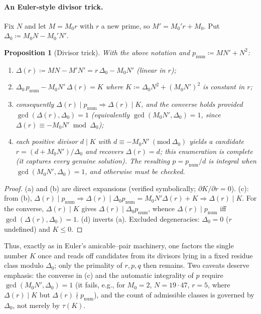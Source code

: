 \documentclass[11pt]{article}
\newtheorem{proposition}[theorem]{Proposition}
\theoremstyle{definition}
\begin{document}
\paragraph{An Euler-style divisor trick.}
Fix $N$ and let $M=M_0r$ with $r$ a new prime, so $M'=M_0'r+M_0$. Put
$\Delta_0\coloneqq M_0N-M_0'N'$.

\begin{proposition}[Divisor trick]\label{prop:divisor}
With the above notation and $p_{\mathrm{num}}\coloneqq MN'+N^2$:
\begin{enumerate}[label=\textup{(\alph*)},leftmargin=2.2em]
\item $\Delta(r)\coloneqq MN-M'N'=r\,\Delta_0-M_0N'$ \emph{(linear in $r$)};
\item $\Delta_0\,p_{\mathrm{num}}-M_0N'\,\Delta(r)=K$ where $K\coloneqq \Delta_0N^2+(M_0N')^2$ is
\emph{constant in $r$};
\item consequently $\Delta(r)\mid p_{\mathrm{num}}\Rightarrow \Delta(r)\mid K$, and the converse
holds provided $\gcd(\Delta(r),\Delta_0)=1$ \textup{(}equivalently $\gcd(M_0N',\Delta_0)=1$, since
$\Delta(r)\equiv-M_0N'\bmod\Delta_0$\textup{)};
\item each positive divisor $d\mid K$ with $d\equiv-M_0N'\ (\mathrm{mod}\ \Delta_0)$ yields a
candidate $r=(d+M_0N')/\Delta_0$ and recovers $\Delta(r)=d$; this enumeration is complete (it
captures every genuine solution). The resulting $p=p_{\mathrm{num}}/d$ is integral when
$\gcd(M_0N',\Delta_0)=1$, and otherwise must be checked.
\end{enumerate}
\end{proposition}

\begin{proof}
(a) and (b) are direct expansions (verified symbolically; $\partial K/\partial r=0$). (c): from
(b), $\Delta(r)\mid p_{\mathrm{num}}\Rightarrow\Delta(r)\mid\Delta_0p_{\mathrm{num}}
=M_0N'\Delta(r)+K\Rightarrow\Delta(r)\mid K$. For the converse, $\Delta(r)\mid K$ gives
$\Delta(r)\mid\Delta_0p_{\mathrm{num}}$, whence $\Delta(r)\mid p_{\mathrm{num}}$ iff
$\gcd(\Delta(r),\Delta_0)=1$. (d) inverts (a). Excluded degeneracies: $\Delta_0=0$ ($r$ undefined)
and $K\le0$.
\end{proof}

Thus, exactly as in Euler's amicable--pair machinery, one factors the single number $K$ once and
reads off candidates from its divisors lying in a fixed residue class modulo $\Delta_0$; only the
primality of $r,p,q$ then remains. Two caveats deserve emphasis:
the converse in (c) and the automatic integrality of $p$ require $\gcd(M_0N',\Delta_0)=1$ (it fails,
e.g., for $M_0=2$, $N=19\cdot47$, $r=5$, where $\Delta(r)\mid K$ but $\Delta(r)\nmid
p_{\mathrm{num}}$), and the count of admissible classes is governed by $\Delta_0$, not merely by
$\tau(K)$.
\end{document}
